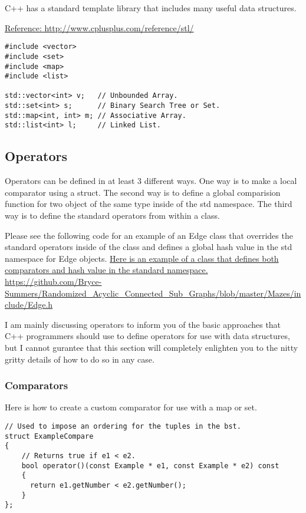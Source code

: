\documentclass[12pt, letterpaper]{article}
\begin{document}
C++ has a standard template library that includes many useful data structures.

\href{http://www.cplusplus.com/reference/stl/}{Reference: http://www.cplusplus.com/reference/stl/}

\begin{verbatim}
#include <vector>
#include <set>
#include <map>
#include <list>

std::vector<int> v;   // Unbounded Array.
std::set<int> s;      // Binary Search Tree or Set.
std::map<int, int> m; // Associative Array.
std::list<int> l;     // Linked List.
\end{verbatim}

\subsection{Operators}

Operators can be defined in at least 3 different ways. One way is to make a local comparator using a struct. The second way is to define a global comparision function for two object of the same type inside of the std namespace. The third way is to define the standard operators from within a class.

Please see the following code for an example of an Edge class that overrides the standard operators inside of the class and defines a global hash value in the std namespace for Edge objects.
\href{https://github.com/Bryce-Summers/Randomized_Acyclic_Connected_Sub_Graphs/blob/master/Mazes/include/Edge.h}{Here is an example of a class that defines both comparators and hash value in the standard namespace.} 
\url{https://github.com/Bryce-Summers/Randomized_Acyclic_Connected_Sub_Graphs/blob/master/Mazes/include/Edge.h} 

I am mainly discussing operators to inform you of the basic approaches that C++ programmers should use to define operators for use with data structures, but I cannot gurantee that this section will completely enlighten you to the nitty gritty details of how to do so in any case.

\subsubsection{Comparators}

Here is how to create a custom comparator for use with a map or set.

\begin{verbatim}
// Used to impose an ordering for the tuples in the bst.
struct ExampleCompare
{
    // Returns true if e1 < e2.
    bool operator()(const Example * e1, const Example * e2) const
    {
      return e1.getNumber < e2.getNumber();
    }
};
\end{verbatim}
\end{document}
